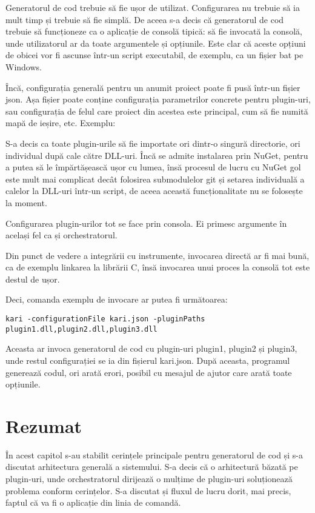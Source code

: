 \documentclass[a4paper,12pt]{report}
\begin{document}
Generatorul de cod trebuie să fie ușor de utilizat.
Configurarea nu trebuie să ia mult timp și trebuie să fie simplă.
De aceea s-a decis că generatorul de cod trebuie să funcționeze ca o aplicație de consolă tipică: să fie invocată la consolă, unde utilizatorul ar da toate argumentele și opțiunile.
Este clar că aceste opțiuni de obicei vor fi ascunse într-un script executabil, de exemplu, ca un fișier bat pe Windows.

Încă, configurația generală pentru un anumit proiect poate fi pusă într-un fișier json.
Așa fișier poate conține configurația parametrilor concrete pentru plugin-uri, sau configurația de felul care proiect din acestea este principal, cum să fie numită mapă de ieșire, etc. Exemplu:




S-a decis ca toate plugin-urile să fie importate ori dintr-o singură directorie, ori individual după cale către DLL-uri.
Încă se admite instalarea prin NuGet, pentru a putea să le împărtășească ușor cu lumea, însă procesul de lucru cu NuGet gol este mult mai complicat decât folosirea submodulelor git și setarea individuală a calelor la DLL-uri într-un script, de aceea această funcționalitate nu se folosește la moment.

Configurarea plugin-urilor tot se face prin consola.
Ei primesc argumente în același fel ca și orchestratorul.

Din punct de vedere a integrării cu instrumente, invocarea directă ar fi mai bună, ca de exemplu linkarea la librării C, însă invocarea unui proces la consolă tot este destul de ușor.

Deci, comanda exemplu de invocare ar putea fi următoarea:

\begin{verbatim}
kari -configurationFile kari.json -pluginPaths plugin1.dll,plugin2.dll,plugin3.dll
\end{verbatim}

Aceasta ar invoca generatorul de cod cu plugin-uri plugin1, plugin2 și plugin3, unde restul configurației se ia din fișierul kari.json.
După aceasta, programul generează codul, ori arată erori, posibil cu mesajul de ajutor care arată toate opțiunile.


\section{Rezumat}

În acest capitol s-au stabilit cerințele principale pentru generatorul de cod și s-a discutat arhitectura generală a sistemului.
S-a decis că o arhitectură băzată pe plugin-uri, unde orchestratorul dirijează o mulțime de plugin-uri soluționează problema conform cerințelor.
S-a discutat și fluxul de lucru dorit, mai precis, faptul că va fi o aplicație din linia de comandă.
\end{document}

